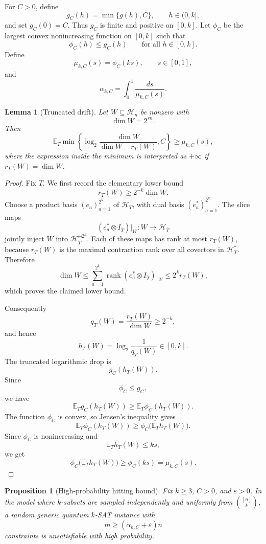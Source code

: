 \documentclass[11pt]{article}
\newtheorem{lemma}{Lemma}
\newtheorem{proposition}{Proposition}
\DeclareMathOperator{\rank}{rank}
\begin{document}
	For \(C>0\), define
	\[
	g_C(h)=\min\{g(h),C\},
	\qquad h\in(0,k],
	\]
	and set \(g_C(0)=C\). Thus \(g_C\) is finite and positive on \([0,k]\).
	Let \(\phi_C\) be the largest convex nonincreasing function on \([0,k]\)
	such that
	\[
	\phi_C(h)\le g_C(h)
	\qquad\text{for all }h\in[0,k].
	\]
	Define
	\[
	\mu_{k,C}(s)=\phi_C(ks),
	\qquad s\in[0,1],
	\]
	and
	\[
	\alpha_{k,C}
	=
	\int_0^1\frac{ds}{\mu_{k,C}(s)}.
	\]
	
	\begin{lemma}[Truncated drift]
		Let \(W\subseteq\mathcal H_n\) be nonzero with
		\[
		\dim W=2^{sn}.
		\]
		Then
		\[
		\mathbb E_T
		\min\left\{
		\log_2\frac{\dim W}{\dim W-r_T(W)},C
		\right\}
		\ge
		\mu_{k,C}(s),
		\]
		where the expression inside the minimum is interpreted as \(+\infty\) if
		\(r_T(W)=\dim W\).
	\end{lemma}
	
	\begin{proof}
		Fix \(T\). We first record the elementary lower bound
		\[
		r_T(W)\ge 2^{-k}\dim W.
		\]
		Choose a product basis \((e_a)_{a=1}^{2^k}\) of \(\mathcal H_T\), with dual
		basis \((e_a^*)_{a=1}^{2^k}\). The slice maps
		\[
		(e_a^*\otimes I_{\bar T})|_W:W\to\mathcal H_{\bar T}
		\]
		jointly inject \(W\) into \(\mathcal H_{\bar T}^{\oplus 2^k}\). Each of these
		maps has rank at most \(r_T(W)\), because \(r_T(W)\) is the maximal
		contraction rank over all covectors in \(\mathcal H_T^*\). Therefore
		\[
		\dim W\le \sum_{a=1}^{2^k}\rank (e_a^*\otimes I_{\bar T})|_W
		\le 2^k r_T(W),
		\]
		which proves the claimed lower bound.
		
		Consequently
		\[
		q_T(W)=\frac{r_T(W)}{\dim W}\ge 2^{-k},
		\]
		and hence
		\[
		h_T(W)=\log_2\frac1{q_T(W)}\in[0,k].
		\]
		The truncated logarithmic drop is
		\[
		g_C(h_T(W)).
		\]
		Since
		\[
		\phi_C\le g_C,
		\]
		we have
		\[
		\mathbb E_T g_C(h_T(W))
		\ge
		\mathbb E_T\phi_C(h_T(W)).
		\]
		The function \(\phi_C\) is convex, so Jensen's inequality gives
		\[
		\mathbb E_T\phi_C(h_T(W))
		\ge
		\phi_C\bigl(\mathbb E_T h_T(W)\bigr).
		\]
		Since \(\phi_C\) is nonincreasing and
		\[
		\mathbb E_T h_T(W)\le ks,
		\]
		we get
		\[
		\phi_C\bigl(\mathbb E_T h_T(W)\bigr)
		\ge
		\phi_C(ks)
		=
		\mu_{k,C}(s).
		\]
	\end{proof}
	
	\begin{proposition}[High-probability hitting bound]
		Fix \(k\ge3\), \(C>0\), and \(\varepsilon>0\). In the model where
		\(k\)-subsets are sampled independently and uniformly from
		\(\binom{[n]}k\), a random generic quantum \(k\)-SAT instance with
		\[
		m\ge(\alpha_{k,C}+\varepsilon)n
		\]
		constraints is unsatisfiable with high probability.
	\end{proposition}
	
\end{document}
